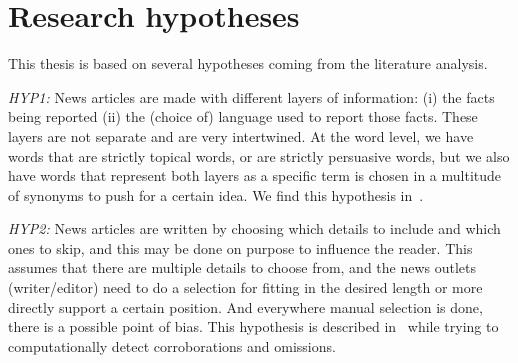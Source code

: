 


\section{\statusgreen Research hypotheses}
\label{sec:intro_hyp}

This thesis is based on several hypotheses coming from the literature analysis.

\emph{HYP1:} News articles are made with different layers of information: (i) the facts being reported (ii) the (choice of) language used to report those facts. %
These layers are not separate and are very intertwined. At the word level, we have words that are strictly topical words, or are strictly persuasive words, but we also have words that represent both layers as a specific term is chosen in a multitude of synonyms to push for a certain idea.
We find this hypothesis in~\citep{jenkins2013thin,vanderwicken1995news,jang2023proximate}.

\emph{HYP2:} News articles are written by choosing which details to include and which ones to skip, and this may be done on purpose to influence the reader. This assumes that there are multiple details to choose from, and the news outlets (writer/editor) need to do a selection for fitting in the desired length or more directly support a certain position. And everywhere manual selection is done, there is a possible point of bias. This hypothesis is described in~\cite{bountouridis2018explaining} while trying to computationally detect corroborations and omissions.

